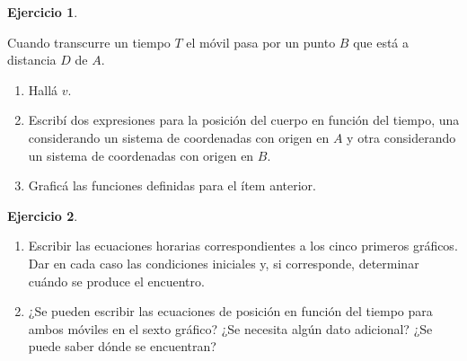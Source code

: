 \documentclass[a4paper,12pt,twoside]{book}
\newtheorem{ejercicio}{{Ejercicio}}[chapter]
\begin{document}
\begin{mdframed}[style=ejercicio-facil]
    \begin{ejercicio}
    \end{ejercicio}
    Cuando transcurre un tiempo $T$ el móvil pasa por un punto $B$ que está a distancia $D$ de $A$.
    \begin{enumerate}
        \item Hallá $v$.
        \item Escribí dos expresiones para la posición del cuerpo en función del tiempo, una considerando un sistema de coordenadas con origen en $A$ y otra considerando un sistema de coordenadas con origen en $B$.
        \item Graficá las funciones definidas para el ítem anterior.
    \end{enumerate}
\end{mdframed}

\begin{mdframed}[style=ejercicio-facil]
    \begin{ejercicio}
    \end{ejercicio}
    \begin{center}
        \def\svgwidth{0.6\linewidth}
        
    \end{center}
    \begin{enumerate}
        \item Escribir las ecuaciones horarias correspondientes a los cinco primeros gráficos. Dar en cada caso las condiciones iniciales y, si corresponde, determinar cuándo se produce el encuentro.
        \item ¿Se pueden escribir las ecuaciones de posición en función del tiempo para ambos móviles en el sexto gráfico? ¿Se necesita algún dato adicional? ¿Se puede saber dónde se encuentran?
    \end{enumerate}
\end{mdframed}
\end{document}
